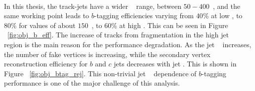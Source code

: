 \paragraph{}
In this thesis, the track-jets have a wider \pt~ range, between $50-400$~\GeV, and the same working point leads to $b$-tagging efficiencies varying from $40\%$ at low \pt, to $80\%$ for \pt values of about $150$~\GeV, to $60\%$ at high \pt. This can be seen in Figure ~\ref{fig:obj_b_eff}.
The increase of tracks from fragmentation in the high jet \pt~ region is the main reason for the performance degradation. 
As the jet \pt~ increases, the number of fake vertices is increasing, while the secondary vertex reconstruction efficiency for $b$ and $c$ jets decreases with jet \pt. This is shown in Figure ~\ref{fig:obj_btag_rej}. This non-trivial jet \pt~ dependence of $b$-tagging performance is one of the major challenge of this analysis.

